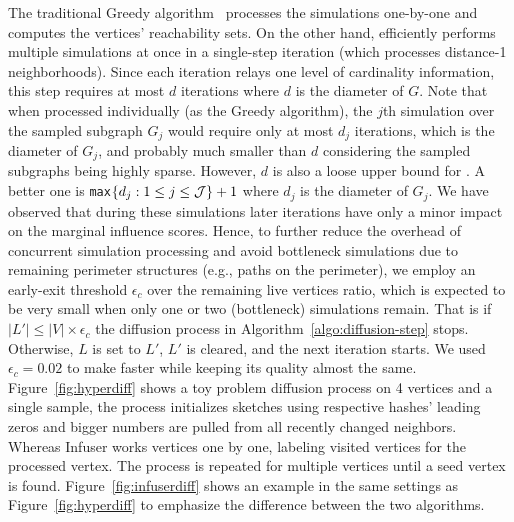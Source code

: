 The traditional Greedy algorithm~\cite{kempe2003maximizing} processes the simulations one-by-one and computes the vertices' reachability sets. On the other hand, \acro efficiently performs multiple simulations at once in a single-step iteration (which processes distance-1 neighborhoods). Since each iteration relays one level of cardinality information, this step requires at most $d$ iterations where $d$ is the diameter of $G$. Note that when processed individually (as the Greedy algorithm), the $j$th simulation over the sampled subgraph $G_j$ would require only at most $d_j$ iterations, which is the diameter of $G_j$, and probably much smaller than $d$ considering the sampled subgraphs being highly sparse. However, $d$ is also a loose upper bound for \acro. A better one is {\tt max}$\{d_j: 1 \leq j \leq {\cal J}\} + 1$ where $d_j$ is the diameter of $G_j$. We have observed that during these simulations later iterations have only a minor impact on the marginal influence scores. Hence, to further reduce the overhead of concurrent simulation processing and avoid bottleneck simulations due to remaining perimeter structures (e.g., paths on the perimeter), we employ an early-exit threshold $\epsilon_c$ over the remaining live vertices ratio, which is expected to be very small when only one or two (bottleneck) simulations remain. That is if $|L'| \leq |V| \times \epsilon_c$ the diffusion process in Algorithm~\ref{algo:diffusion-step} stops. Otherwise, $L$ is set to $L'$, $L'$ is cleared, and the next iteration starts. We used $\epsilon_c = 0.02$ to make \acro faster while keeping its quality almost the same. Figure~\ref{fig:hyperdiff} shows a toy problem diffusion process on 4 vertices and a single sample, the process initializes sketches using respective hashes' leading zeros and bigger numbers are pulled from all recently changed neighbors. Whereas Infuser works vertices one by one, labeling visited vertices for the processed vertex. The process is repeated for multiple vertices until a seed vertex is found. Figure~\ref{fig:infuserdiff} shows an example in the same settings as Figure~\ref{fig:hyperdiff} to emphasize the difference between the two algorithms.


